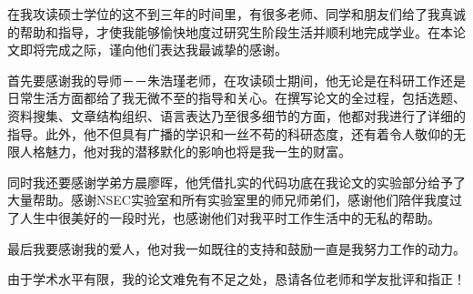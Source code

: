 
\begin{thanks}

在我攻读硕士学位的这不到三年的时间里，有很多老师、同学和朋友们给了我真诚的帮助和指导，才使我能够愉快地度过研究生阶段生活并顺利地完成学业。在本论文即将完成之际，谨向他们表达我最诚挚的感谢。

首先要感谢我的导师－－朱浩瑾老师，在攻读硕士期间，他无论是在科研工作还是日常生活方面都给了我无微不至的指导和关心。在撰写论文的全过程，包括选题、资料搜集、文章结构组织、语言表达乃至很多细节的方面，他都对我进行了详细的指导。此外，他不但具有广播的学识和一丝不苟的科研态度，还有着令人敬仰的无限人格魅力，他对我的潜移默化的影响也将是我一生的财富。

同时我还要感谢学弟方晨廖晖，他凭借扎实的代码功底在我论文的实验部分给予了大量帮助。感谢NSEC实验室和所有实验室里的师兄师弟们，感谢他们陪伴我度过了人生中很美好的一段时光，也感谢他们对我平时工作生活中的无私的帮助。

最后我要感谢我的爱人，他对我一如既往的支持和鼓励一直是我努力工作的动力。

由于学术水平有限，我的论文难免有不足之处，恳请各位老师和学友批评和指正！
  

\end{thanks}
